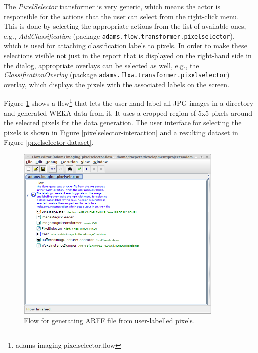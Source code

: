 \documentclass[a4paper]{book}
\begin{document}
The \textit{PixelSelector} transformer is very generic, which means the actor
is responsible for the actions that the user can select from the right-click
menu. This is done by selecting the appropriate actions from the list of
available ones, e.g., \textit{AddClassification} (package
\texttt{adams.flow.transformer.pixelselector}), which is used for attaching
classification labels to pixels. In order to make these selections visible not
just in the report that is displayed on the right-hand side in the dialog,
appropriate overlays can be selected as well, e.g., the
\textit{ClassificationOverlay} (package
\texttt{adams.flow.transformer.pixelselector}) overlay, which displays the
pixels with the associated labels on the screen.

Figure \ref{pixelselector-flow} shows a
flow\footnote{adams-imaging-pixelselector.flow} that lets the user hand-label
all JPG images in a directory and generated WEKA data from it. It uses a cropped
region of 5x5 pixels around the selected pixels for the data generation. The
user interface for selecting the pixels is shown in Figure
\ref{pixelselector-interaction} and a resulting dataset in Figure
\ref{pixelselector-dataset}.

\begin{figure}[htb]
  \centering
  \includegraphics[width=10.0cm]{images/pixelselector-flow.png}
  \caption{Flow for generating ARFF file from user-labelled pixels.}
  \label{pixelselector-flow}
\end{figure}
\end{document}
